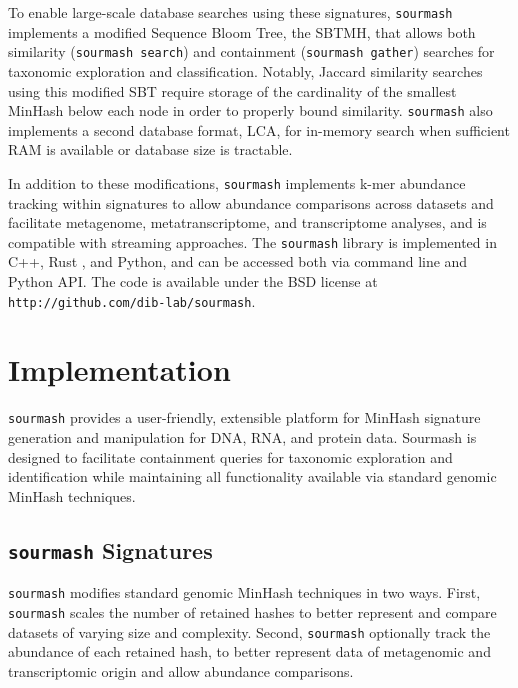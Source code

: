 \documentclass[10pt,a4paper,twocolumn]{article}
\begin{document}
To enable large-scale database searches using these signatures, \lstinline{sourmash} implements a modified Sequence Bloom Tree, the SBTMH, that allows both similarity (\lstinline{sourmash search}) and containment (\lstinline{sourmash gather}) searches for taxonomic exploration and classification. Notably, Jaccard similarity searches using this modified SBT require storage of the cardinality of the smallest MinHash below each node in order to properly bound similarity. \lstinline{sourmash} also implements a second database format, LCA, for in-memory search when sufficient RAM is available or database size is tractable. 

In addition to these modifications, \lstinline{sourmash} implements k-mer abundance tracking \cite{boveefinch} within signatures to allow abundance comparisons across datasets and facilitate metagenome, metatranscriptome, and transcriptome analyses, and is compatible with streaming approaches. 
The \lstinline{sourmash} library is implemented in C++, Rust \cite{Matsakis:2014:RL:2692956.2663188}, and Python, and can be accessed both via command line and Python API. The code is available under the BSD license at \lstinline{http://github.com/dib-lab/sourmash}. %


\section*{Implementation}

\lstinline{sourmash} provides a user-friendly, extensible platform for MinHash signature generation and manipulation for DNA, RNA, and protein data. Sourmash is designed to facilitate containment queries for taxonomic exploration and identification while maintaining all functionality available via standard genomic MinHash techniques. %



\subsection*{\lstinline{sourmash} Signatures}

\lstinline{sourmash} modifies standard genomic MinHash techniques in two ways. First, \lstinline{sourmash} scales the number of retained hashes to better represent and compare datasets of varying size and complexity. Second, \lstinline{sourmash} optionally track the abundance of each retained hash, to better represent data of metagenomic and transcriptomic origin and allow abundance comparisons.
\end{document}
